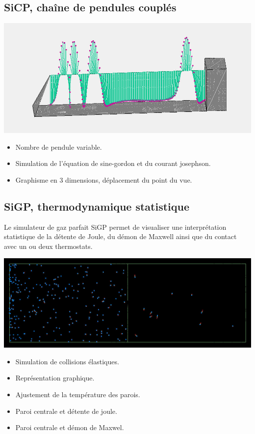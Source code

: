 \subsection{SiCP, chaîne de pendules couplés}
%
\begin{center}
\includegraphics[scale=0.41]{./titre/SiCP}
\end{center}
%
\begin{itemize}[leftmargin=1cm, label=, itemsep=0pt]
\item Nombre de pendule variable.
\item Simulation de l'équation de sine-gordon et du courant josephson.
\item Graphisme en 3 dimensions, déplacement du point du vue.
\end{itemize}
%
\subsection{SiGP, thermodynamique statistique}
%
Le simulateur de gaz parfait SiGP permet de visualiser une interprétation statistique de la détente de Joule, du démon de Maxwell ainsi que du contact avec un ou deux thermostats.
%
\begin{center}
\includegraphics[scale=0.41]{./titre/SiGP}
\end{center}
%
\begin{itemize}[leftmargin=1cm, label=, itemsep=0pt]
\item Simulation de collisions élastiques.
\item Représentation graphique. 
\item Ajustement de la température des parois.
\item Paroi centrale et détente de joule.
\item Paroi centrale et démon de Maxwel.
\end{itemize}
%
%
